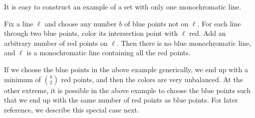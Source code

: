 \documentclass[a4paper,11pt,leqno]{article}
\begin{document}
It is easy to construct an example of a set with only one monochromatic line.
\begin{example}\label{ex:one-monochromatic-line}
Fix a line $\ell$ and choose any number $b$ of blue points not on $\ell$.
For each line through two blue points, color its intersection point with $\ell$ red.
Add an arbitrary number of red points on $\ell$.
Then there is no blue monochromatic line, and $\ell$ is a monochromatic line containing all the red points.
\end{example}
If we choose the blue points in the above example generically, we end up with a minimum of $\binom{b}{2}$ red points, and then the colors are very unbalanced.
At the other extreme, it is possible in the above example to choose the blue points such that we end up with the same number of red points as blue points.
For later reference, we describe this special case next.
\end{document}
